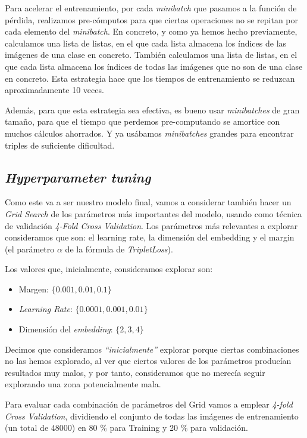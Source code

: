 \documentclass[11pt]{article}
\newcommand{\entrecomillado}[1]{\emph{``#1''}}
\begin{document}
Para acelerar el entrenamiento, por cada \emph{minibatch} que pasamos a la función de pérdida, realizamos pre-cómputos para que ciertas operaciones no se repitan por cada elemento del \emph{minibatch}. En concreto, y como ya hemos hecho previamente, calculamos una lista de listas, en el que cada lista almacena los índices de las imágenes de una clase en concreto. También calculamos una lista de listas, en el que cada lista almacena los índices de todas las imágenes que no son de una clase en concreto. Esta estrategia hace que los tiempos de entrenamiento se reduzcan aproximadamente 10 veces.

Además, para que esta estrategia sea efectiva, es bueno usar \emph{minibatches} de gran tamaño, para que el tiempo que perdemos pre-computando se amortice con muchos cálculos ahorrados. Y ya usábamos \emph{minibatches} grandes para encontrar triples de suficiente dificultad.

\subsection{\emph{Hyperparameter tuning}} \label{hyperparameter_tuning:seccion}

Como este va a ser nuestro modelo final, vamos a considerar también hacer un \emph{Grid Search} de los parámetros más importantes del modelo, usando como técnica de validación \emph{4-Fold Cross Validation}. Los parámetros más relevantes a explorar consideramos que son: el learning rate, la dimensión del embedding y el margin (el parámetro $\alpha$ de la fórmula de \emph{TripletLoss}).

Los valores que, inicialmente, consideramos explorar son:

\begin{itemize}
  \item Margen: $\{0.001, 0.01, 0.1\}$
  \item \emph{Learning Rate}: $\{0.0001, 0.001, 0.01\}$
  \item Dimensión del \emph{embedding}: $\{2, 3, 4\}$
\end{itemize}

Decimos que consideramos \entrecomillado{inicialmente} explorar porque ciertas combinaciones no las hemos explorado, al ver que ciertos valores de los parámetros producían resultados muy malos, y por tanto, consideramos que no merecía seguir explorando una zona potencialmente mala.

Para evaluar cada combinación de parámetros del Grid vamos a emplear \emph{4-fold Cross Validation}, dividiendo el conjunto de todas las imágenes de entrenamiento (un total de 48000) en 80 \% para Training y 20 \% para validación.
\end{document}
